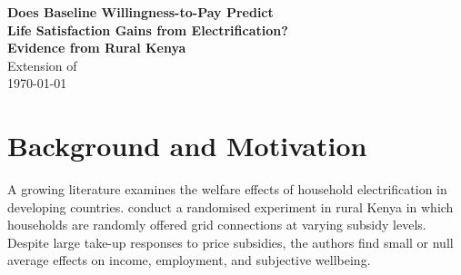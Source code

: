 \documentclass[12pt]{article}
\begin{document}
\begin{titlepage}
\begin{center}
\vspace*{1.5cm}
{\large \textbf{Does Baseline Willingness-to-Pay Predict\\[0.3em]
Life Satisfaction Gains from Electrification?\\[0.3em]
Evidence from Rural Kenya}}\\[2em]
{\normalsize Extension of \citet{lee2019jpe}}\\[1.5em]
{\normalsize \today}
\end{center}

\vspace{2em}
\begin{abstract}
\noindent
We ask whether a household's stated willingness-to-pay (WTP) for a grid
electricity connection at baseline predicts the life satisfaction gains it
realises from connection. Using data from the randomised experiment of
\citet{lee2019jpe}, we merge a contingent-valuation WTP measure from the
2014 baseline survey with subjective wellbeing outcomes from two follow-up
rounds (2016, 2017). We estimate heterogeneous intent-to-treat (ITT) effects
on a normalised life satisfaction index and a perceptions-of-security index,
interacting the treatment indicator with a binary high-WTP variable. The
differential ITT coefficient is small (${-}0.018$ standard deviations) and
statistically insignificant in all specifications. After Benjamini--Hochberg
correction, neither outcome survives multiple-testing adjustment
($q \geq 0.95$). These results are consistent with the null average
wellbeing effects reported by \citet{lee2019jpe} and suggest that
prior expectations, as proxied by stated WTP, do not meaningfully
moderate the wellbeing impact of grid connection.
\end{abstract}
\end{titlepage}

\section{Background and Motivation}
\label{sec:background}

A growing literature examines the welfare effects of household
electrification in developing countries. \citet{lee2019jpe} conduct a
randomised experiment in rural Kenya in which households are randomly
offered grid connections at varying subsidy levels. Despite large take-up
responses to price subsidies, the authors find small or null average
effects on income, employment, and subjective wellbeing.
\end{document}
